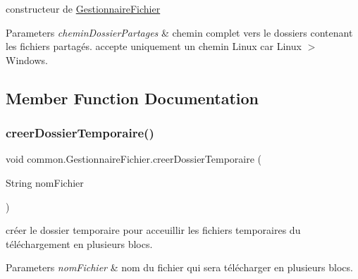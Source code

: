constructeur de \hyperlink{classcommon_1_1GestionnaireFichier}{Gestionnaire\+Fichier} 


\begin{DoxyParams}{Parameters}
{\em chemin\+Dossier\+Partages} & chemin complet vers le dossiers contenant les fichiers partagés. accepte uniquement un chemin Linux car Linux $>$ Windows. \\
\hline
\end{DoxyParams}


\subsection{Member Function Documentation}
\mbox{\label{classcommon_1_1GestionnaireFichier_aa32c12e7c7269b4142b4f93dc89603b7}} 
\subsubsection{\texorpdfstring{creer\+Dossier\+Temporaire()}{creerDossierTemporaire()}}
{\footnotesize\ttfamily void common.\+Gestionnaire\+Fichier.\+creer\+Dossier\+Temporaire (\begin{DoxyParamCaption}\item[{String}]{nom\+Fichier }\end{DoxyParamCaption})\hspace{0.3cm}{\ttfamily [inline]}}



créer le dossier temporaire pour acceuillir les fichiers temporaires du téléchargement en plusieurs blocs. 


\begin{DoxyParams}{Parameters}
{\em nom\+Fichier} & nom du fichier qui sera télécharger en plusieurs blocs. \\
\hline
\end{DoxyParams}
\mbox{\label{classcommon_1_1GestionnaireFichier_a7aa94ceed1766208e16cd4d3ce8465b7}} 
